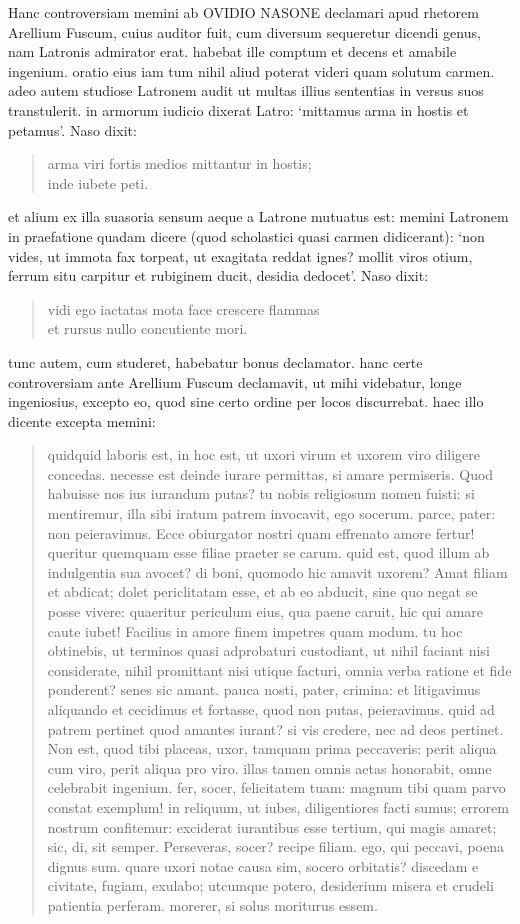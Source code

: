Hanc controversiam memini ab OVIDIO NASONE declamari apud rhetorem Arellium Fuscum, cuius auditor fuit, cum diversum sequeretur dicendi genus‚ nam Latronis admirator erat. habebat ille comptum et decens et amabile ingenium. oratio eius iam tum nihil aliud poterat videri quam solutum carmen. adeo autem studiose Latronem audit ut multas illius sententias in versus suos transtulerit. in armorum iudicio dixerat Latro: `mittamus arma in hostis et petamus'. Naso dixit:
\begin{verse}
arma viri fortis medios mittantur in hostis;\\
inde iubete peti.
\end{verse}
et alium ex illa suasoria sensum aeque a Latrone mutuatus est: memini Latronem in praefatione quadam dicere (quod scholastici quasi carmen didicerant): `non vides, ut immota fax torpeat, ut exagitata reddat ignes? mollit viros otium, ferrum situ carpitur et rubiginem ducit, desidia dedocet'. Naso dixit:
\begin{verse}
vidi ego iactatas mota face crescere flammas\\
et rursus nullo concutiente mori.
\end{verse}
tunc autem, cum studeret, habebatur bonus declamator. hanc certe controversiam ante Arellium Fuscum declamavit, ut mihi videbatur, longe ingeniosius, excepto eo, quod sine certo ordine per locos discurrebat. haec illo dicente excepta memini: 

\begin{quotation}
quidquid laboris est, in hoc est, ut uxori virum et uxorem viro diligere concedas. necesse est deinde iurare permittas, si amare permiseris. Quod habuisse nos ius iurandum putas? tu nobis religiosum nomen fuisti: si mentiremur, illa sibi iratum patrem invocavit, ego socerum. parce, pater: non peieravimus. Ecce obiurgator nostri quam effrenato amore fertur! queritur quemquam esse filiae praeter se carum. quid est, quod illum ab indulgentia sua avocet? di boni, quomodo hic amavit uxorem? Amat filiam et abdicat; dolet periclitatam esse, et ab eo abducit, sine quo negat se posse vivere: quaeritur periculum eius, qua paene caruit, hic qui amare caute iubet! Facilius in amore finem impetres quam modum. tu hoc obtinebis, ut terminos quasi adprobaturi custodiant, ut nihil faciant nisi considerate, nihil promittant nisi utique facturi, omnia verba ratione et fide ponderent? senes sic amant. pauca nosti, pater, crimina: et litigavimus aliquando et cecidimus et fortasse, quod non putas, peieravimus. quid ad patrem pertinet quod amantes iurant? si vis credere, nec ad deos pertinet. Non est, quod tibi placeas, uxor, tamquam prima peccaveris: perit aliqua cum viro, perit aliqua pro viro. illas tamen omnis aetas honorabit, omne celebrabit ingenium. fer, socer, felicitatem tuam: magnum tibi quam parvo constat exemplum! in reliquum, ut iubes, diligentiores facti sumus; errorem nostrum confitemur: exciderat iurantibus esse tertium, qui magis amaret; sic, di, sit semper. Perseveras, socer? recipe filiam. ego, qui peccavi, poena dignus sum. quare uxori notae causa sim, socero orbitatis? discedam e civitate, fugiam, exulabo; utcumque potero, desiderium misera et crudeli patientia perferam. morerer, si solus moriturus essem.
\end{quotation}

